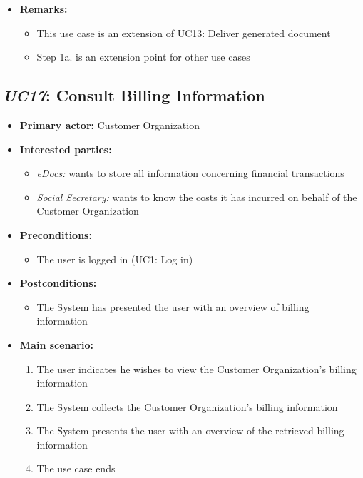 \documentclass[a4paper,10pt]{article}
\begin{document}
\begin{itemize}
    \item \textbf{Remarks:}
        \begin{itemize}
          \item This use case is an extension of UC13: Deliver generated document
          \item Step 1a. is an extension point for other use cases
        \end{itemize}
\end{itemize}

\subsection{\emph{UC17}: Consult Billing Information}
\begin{itemize}
	\item \textbf{Primary actor:} Customer Organization
	\item \textbf{Interested parties:} 
	\begin{itemize}
		\item \textit{eDocs:} wants to store all information concerning financial transactions
		\item \textit{Social Secretary:} wants to know the costs it has incurred on behalf of the Customer Organization
	\end{itemize}
	
	\item \textbf{Preconditions:}
	\begin{itemize}
		\item The user is logged in (UC1: Log in)
	\end{itemize}
	
	\item \textbf{Postconditions:}
	\begin{itemize}
		\item The System has presented the user with an overview of billing information
	\end{itemize}
	
	\item \textbf{Main scenario:} 
	\begin{enumerate}
		\item The user indicates he wishes to view the Customer Organization's billing information
		\item The System collects the Customer Organization's billing information
		\item The System presents the user with an overview of the retrieved billing information
		\item The use case ends
	\end{enumerate}
	

\end{itemize}
\end{document}
